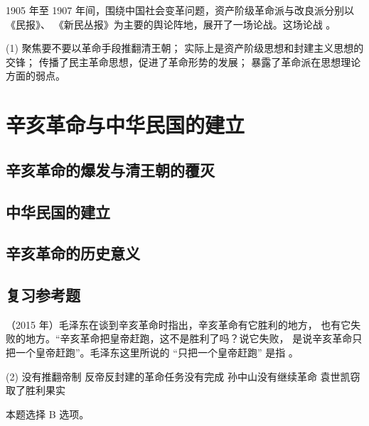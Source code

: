\documentclass[10pt, UTF8]{book} %
\begin{document}
\begin{example}
    1905 年至 1907 年间，围绕中国社会变革问题，资产阶级革命派与改良派分别以《民报》、
    《新民丛报》为主要的舆论阵地，展开了一场论战。这场论战 \underline{\qquad \qquad \qquad}。
    \begin{tasks}[label={\Alph*.}](1)
        \task 聚焦要不要以革命手段推翻清王朝；
        \task 实际上是资产阶级思想和封建主义思想的交锋；
        \task 传播了民主革命思想，促进了革命形势的发展；
        \task 暴露了革命派在思想理论方面的弱点。
    \end{tasks}
\end{example}

\section{辛亥革命与中华民国的建立}

\subsection{辛亥革命的爆发与清王朝的覆灭}
\subsection{中华民国的建立}
\subsection{辛亥革命的历史意义}
\subsection{复习参考题}

\begin{example}
    （2015 年）毛泽东在谈到辛亥革命时指出，辛亥革命有它胜利的地方，
    也有它失败的地方。“辛亥革命把皇帝赶跑，这不是胜利了吗？说它失败，
    是说辛亥革命只把一个皇帝赶跑”。毛泽东这里所说的 “只把一个皇帝赶跑”
    是指 \underline{\qquad \qquad \qquad}。
    \begin{tasks}[label={\Alph*.}](2)
        \task 没有推翻帝制
        \task 反帝反封建的革命任务没有完成
        \task 孙中山没有继续革命
        \task 袁世凯窃取了胜利果实
    \end{tasks}
    \begin{cmt}
        本题选择 B 选项。
    \end{cmt}
\end{example}

\newpage

\begin{mdframed}[frametitle={两次辩论}]
    
\end{mdframed}
\end{document}
